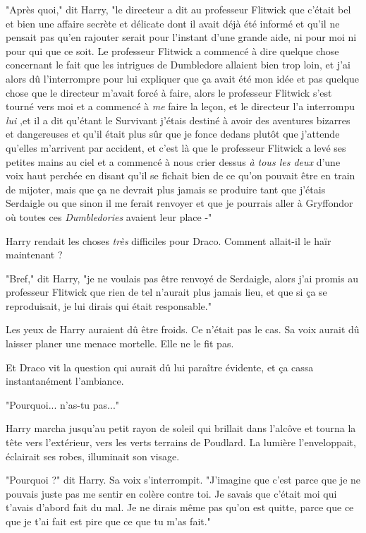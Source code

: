 "Après quoi," dit Harry, "le directeur a dit au professeur Flitwick que c'était bel et bien une affaire secrète et délicate dont il avait déjà été informé et qu'il ne pensait pas qu'en rajouter serait pour l'instant d'une grande aide, ni pour moi ni pour qui que ce soit. Le professeur Flitwick a commencé à dire quelque chose concernant le fait que les intrigues de Dumbledore allaient bien trop loin, et j'ai alors dû l'interrompre pour lui expliquer que ça avait été mon idée et pas quelque chose que le directeur m'avait forcé à faire, alors le professeur Flitwick s'est tourné vers moi et a commencé à \emph{me}  faire la leçon, et le directeur l'a interrompu \emph{lui} ,et il a dit qu'étant le Survivant j'étais destiné à avoir des aventures bizarres et dangereuses et qu'il était plus sûr que je fonce dedans plutôt que j'attende qu'elles m'arrivent par accident, et c'est là que le professeur Flitwick a levé ses petites mains au ciel et a commencé à nous crier dessus \emph{à tous les deux } d'une voix haut perchée en disant qu'il se fichait bien de ce qu'on pouvait être en train de mijoter, mais que ça ne devrait plus jamais se produire tant que j'étais Serdaigle ou que sinon il me ferait renvoyer et que je pourrais aller à Gryffondor où toutes ces \emph{Dumbledories}  avaient leur place -"

Harry rendait les choses \emph{très}  difficiles pour Draco. Comment allait-il le haïr maintenant ?

"Bref," dit Harry, "je ne voulais pas être renvoyé de Serdaigle, alors j'ai promis au professeur Flitwick que rien de tel n'aurait plus jamais lieu, et que si ça se reproduisait, je lui dirais qui était responsable."

Les yeux de Harry auraient dû être froids. Ce n'était pas le cas. Sa voix aurait dû laisser planer une menace mortelle. Elle ne le fit pas.

Et Draco vit la question qui aurait dû lui paraître évidente, et ça cassa instantanément l'ambiance.

"Pourquoi... n'as-tu pas..."

Harry marcha jusqu'au petit rayon de soleil qui brillait dans l'alcôve et tourna la tête vers l'extérieur, vers les verts terrains de Poudlard. La lumière l'enveloppait, éclairait ses robes, illuminait son visage.

"Pourquoi ?" dit Harry. Sa voix s'interrompit. "J'imagine que c'est parce que je ne pouvais juste pas me sentir en colère contre toi. Je savais que c'était moi qui t'avais d'abord fait du mal. Je ne dirais même pas qu'on est quitte, parce que ce que je t'ai fait est pire que ce que tu m'as fait."


